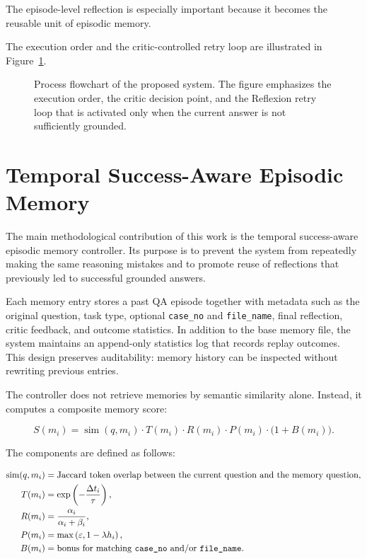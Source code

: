The episode-level reflection is especially important because it becomes the reusable unit of episodic memory.

The execution order and the critic-controlled retry loop are illustrated in Figure~\ref{fig:methodology-process}.

\begin{figure}[H]
    \centering
    
    \caption{Process flowchart of the proposed system. The figure emphasizes the execution order, the critic decision point, and the Reflexion retry loop that is activated only when the current answer is not sufficiently grounded.}
    \label{fig:methodology-process}
\end{figure}

\section{Temporal Success-Aware Episodic Memory}
\label{sec:methodology-memory}

The main methodological contribution of this work is the temporal success-aware episodic memory controller. Its purpose is to prevent the system from repeatedly making the same reasoning mistakes and to promote reuse of reflections that previously led to successful grounded answers.

Each memory entry stores a past QA episode together with metadata such as the original question, task type, optional \texttt{case\_no} and \texttt{file\_name}, final reflection, critic feedback, and outcome statistics. In addition to the base memory file, the system maintains an append-only statistics log that records replay outcomes. This design preserves auditability: memory history can be inspected without rewriting previous entries.

The controller does not retrieve memories by semantic similarity alone. Instead, it computes a composite memory score:

\begin{equation}
\label{eq:memory-score}
S(m_i) =
\operatorname{sim}(q, m_i)
\cdot T(m_i)
\cdot R(m_i)
\cdot P(m_i)
\cdot \bigl(1 + B(m_i)\bigr).
\end{equation}

The components are defined as follows:

\begin{align}
\operatorname{sim}(q, m_i) &= \text{Jaccard token overlap between the current question and the memory question}, \\
T(m_i) &= \exp\left(-\frac{\Delta t_i}{\tau}\right), \\
R(m_i) &= \frac{\alpha_i}{\alpha_i + \beta_i}, \\
P(m_i) &= \max\left(\varepsilon, 1 - \lambda h_i\right), \\
B(m_i) &= \text{bonus for matching \texttt{case\_no} and/or \texttt{file\_name}}.
\end{align}


